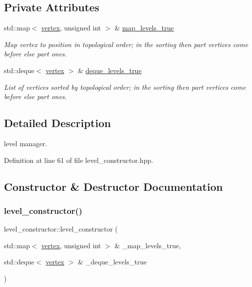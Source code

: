 \subsection*{Private Attributes}
\begin{DoxyCompactItemize}
\item 
std\+::map$<$ \hyperlink{graph_8hpp_abefdcf0544e601805af44eca032cca14}{vertex}, unsigned int $>$ \& \hyperlink{classlevel__constructor_a798b361dccf51771b22154d1e59835c5}{map\+\_\+levels\+\_\+true}
\begin{DoxyCompactList}\small\item\em Map vertex to position in topological order; in the sorting then part vertices come before else part ones. \end{DoxyCompactList}\item 
std\+::deque$<$ \hyperlink{graph_8hpp_abefdcf0544e601805af44eca032cca14}{vertex} $>$ \& \hyperlink{classlevel__constructor_affe9e77ba54da74f81ae087c4ec7442b}{deque\+\_\+levels\+\_\+true}
\begin{DoxyCompactList}\small\item\em List of vertices sorted by topological order; in the sorting then part vertices come before else part ones. \end{DoxyCompactList}\end{DoxyCompactItemize}


\subsection{Detailed Description}
level manager. 

Definition at line 61 of file level\+\_\+constructor.\+hpp.



\subsection{Constructor \& Destructor Documentation}
\mbox{\label{classlevel__constructor_af87499ee57672a337d8cb6e4261d5a47}} 
\subsubsection{\texorpdfstring{level\+\_\+constructor()}{level\_constructor()}}
{\footnotesize\ttfamily level\+\_\+constructor\+::level\+\_\+constructor (\begin{DoxyParamCaption}\item[{std\+::map$<$ \hyperlink{graph_8hpp_abefdcf0544e601805af44eca032cca14}{vertex}, unsigned int $>$ \&}]{\+\_\+map\+\_\+levels\+\_\+true,  }\item[{std\+::deque$<$ \hyperlink{graph_8hpp_abefdcf0544e601805af44eca032cca14}{vertex} $>$ \&}]{\+\_\+deque\+\_\+levels\+\_\+true }\end{DoxyParamCaption})}



